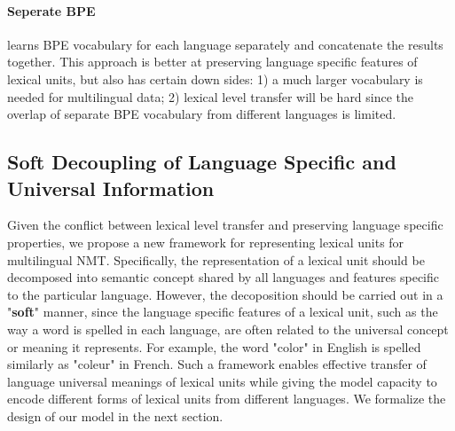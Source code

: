\paragraph{Seperate BPE} learns BPE vocabulary for each language separately and concatenate the results together. This approach is better at preserving language specific features of lexical units, but also has certain down sides: 1) a much larger vocabulary is needed for multilingual data; 2) lexical level transfer will be hard since the overlap of separate BPE vocabulary from different languages is limited.

\subsection{Soft Decoupling of Language Specific and Universal Information}
Given the conflict between lexical level transfer and preserving language specific properties, we propose a new framework for representing lexical units for multilingual NMT. Specifically, the representation of a lexical unit should be decomposed into semantic concept shared by all languages and features specific to the particular language. However, the decoposition should be carried out in a "\textbf{soft}" manner, since the language specific features of a lexical unit, such as the way a word is spelled in each language, are often related to the universal concept or meaning it represents. For example, the word "color" in English is spelled similarly as "coleur" in French. Such a framework enables effective transfer of language universal meanings of lexical units while giving the model capacity to encode different forms of lexical units from different languages. We formalize the design of our model in the next section.  





